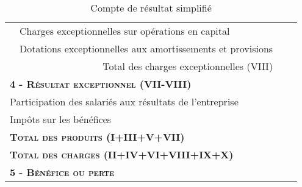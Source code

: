 \begin{table}[h]
\begin{tabular}{|l|p{6cm}|c|c|}
                                                                                              & Charges exceptionnelles sur opérations en capital				 	  &     &   \\ 
\cline{2-4}                                                                                                                                                  
                                                                                              & Dotations exceptionnelles aux amortissements et provisions            &     &   \\ 
\cline{2-4}                                                                                                                                                 
                                                                                              & \multicolumn{1}{r|}{Total des charges exceptionnelles (VIII)}     &     &   \\                                                                                   
\hline
 \multicolumn{2}{|l|}{\hspace{1em} \textbf{\textsc{4 - Résultat exceptionnel (VII-VIII)}}}  &  & \\
\hline
 \multicolumn{2}{|l|}{Participation des salariés aux résultats de l'entreprise}                                                                                       &     & \\
\hline
 \multicolumn{2}{|l|}{Impôts sur les bénéfices}                                                                                       &     & \\
\hline
 \multicolumn{2}{|l|}{\hspace{2em}\textbf{\textsc{Total des produits (I+III+V+VII)}}}                                                 &     & \\
\hline
 \multicolumn{2}{|l|}{\hspace{2em}\textbf{\textsc{Total des charges (II+IV+VI+VIII+IX+X)}}}                                           &     & \\
\hline
 \multicolumn{2}{|l|}{\hspace{1em} \textbf{\textsc{5 - Bénéfice ou perte}}}  &  & \\
\hline
\end{tabular}
\label{compteResultatPage2}
\caption{Compte de résultat simplifié}
\end{table}